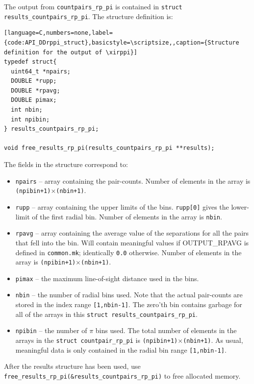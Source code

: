 \documentclass[12pt,titlepage,justified]{article}
\newcommand{\xirppi}{\ensuremath{{\xi(r_p,\pi)}}\xspace}
\begin{document}
The output from \texttt{countpairs\_rp\_pi} is contained in \texttt{struct results\_countpairs\_rp\_pi}. The structure
definition is:
\begin{lstlisting}[language=C,numbers=none,label={code:API_DDrppi_struct},basicstyle=\scriptsize,,caption={Structure definition for the output of \xirppi}]
typedef struct{
  uint64_t *npairs;
  DOUBLE *rupp;
  DOUBLE *rpavg;
  DOUBLE pimax;
  int nbin;
  int npibin;
} results_countpairs_rp_pi;

void free_results_rp_pi(results_countpairs_rp_pi **results);
\end{lstlisting}

The fields in the structure correspond to:
\begin{itemize}
\item \texttt{npairs} -- array containing the pair-counts.  Number of elements in the array is \texttt{(npibin+1)$\times$(nbin+1)}.
\item \texttt{rupp}   -- array containing the upper limits of the bins. \texttt{rupp[0]} gives the lower-limit of the first radial bin. Number of elements 
in the array is \texttt{nbin}. 
\item \texttt{rpavg}  -- array containing the average value of the separations for all the pairs that fell into the bin. Will contain 
meaningful values if OUTPUT\_RPAVG is defined in \texttt{common.mk}; identically \texttt{0.0} otherwise. Number of elements in the array is \texttt{(npibin+1)$\times$(nbin+1)}.
\item \texttt{pimax}  -- the maximum line-of-sight distance used in the bins. 
\item \texttt{nbin}   -- the number of radial bins used. Note that the actual pair-counts are stored in the index range \texttt{[1,nbin-1]}. The
zero'th bin contains garbage for all of the arrays in this \texttt{struct results\_countpairs\_rp\_pi}.
\item \texttt{npibin} -- the number of $\pi$ bins used. The total number of elements in the arrays in the \texttt{struct countpair\_rp\_pi} is 
\texttt{(npibin+1)$\times$(nbin+1)}. As usual, meaningful data is only contained in the radial bin range \texttt{[1,nbin-1]}. 
\end{itemize}
After the results structure has been used, use \texttt{free\_results\_rp\_pi(\&results\_countpairs\_rp\_pi)} to free allocated memory. 
\end{document}
